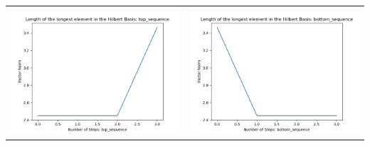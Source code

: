 \documentclass[10pt]{article}
\begin{document}
\begin{tabular}{c|c}
\begin{minipage}{.4\textwidth}
\includegraphics[width=\textwidth]{"DATA/5d/5 generators 1 bound I/top_sequence LENGTH"}
\end{minipage} &
\begin{minipage}{.4\textwidth}
\includegraphics[width=\textwidth]{"DATA/5d/5 generators 1 bound I bottomup/bottom_sequence LENGTH"}
\end{minipage}
\end{tabular}
\end{document}
